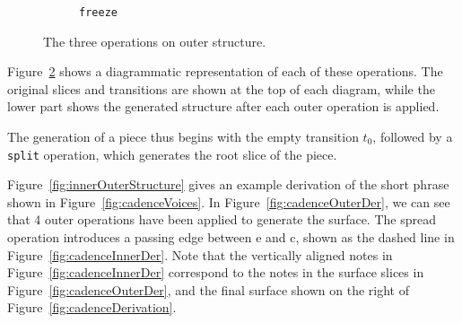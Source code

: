 \documentclass[12pt,a4paper,twoside,openright]{report}
\theoremstyle{definition}
\begin{document}
\begin{figure}[h]
\begin{subfigure}[t]{.24\textwidth}
    \caption{\texttt{freeze}}
    \label{fig:freezeOp}
  \end{subfigure}
  \centering
  \captionsetup{width=.9\linewidth}
  \caption{The three operations on outer structure. }
  \label{fig:outerOperations}
\end{figure}

Figure~\ref{fig:outerOperations} shows a diagrammatic representation of each of these operations. The original slices and transitions are shown at the top of each diagram, while the lower part shows the generated structure after each outer operation is applied.

The generation of a piece thus begins with the empty transition $t_0$, followed by a \texttt{split} operation, which generates the root slice of the piece. 

Figure~\ref{fig:innerOuterStructure} gives an example derivation of the short phrase shown in Figure~\ref{fig:cadenceVoices}. In Figure~\ref{fig:cadenceOuterDer}, we can see that 4 outer operations have been applied to generate the surface. The spread operation introduces a passing edge between e and c, shown as the dashed line in Figure~\ref{fig:cadenceInnerDer}. Note that the vertically aligned notes in Figure~\ref{fig:cadenceInnerDer} correspond to the notes in the surface slices in Figure~\ref{fig:cadenceOuterDer}, and the final surface shown on the right of Figure~\ref{fig:cadenceDerivation}.
\end{document}
